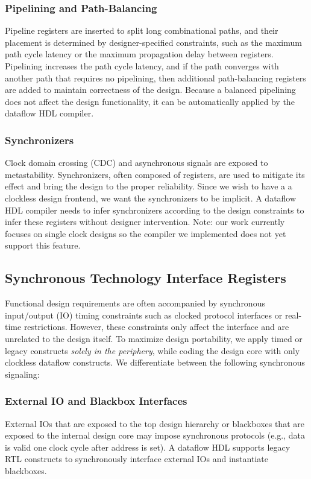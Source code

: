 \subsubsection{Pipelining and Path-Balancing}
Pipeline registers are inserted to split long combinational paths, and their placement is determined by designer-specified constraints, such as the maximum path cycle latency or the maximum propagation delay between registers. Pipelining increases the path cycle latency, and if the path converges with another path that requires no pipelining, then additional path-balancing registers are added to maintain correctness of the design. Because a balanced pipelining does not affect the design functionality, it can be automatically applied by the dataflow HDL compiler.   
\subsubsection{Synchronizers}
Clock domain crossing (CDC) and asynchronous signals are exposed to metastability. Synchronizers, often composed of registers, are used to mitigate its effect and bring the design to the proper reliability. Since we wish to have a a clockless design frontend, we want the synchronizers to be implicit. A dataflow HDL compiler needs to infer synchronizers according to the design constraints to infer these registers without designer intervention. Note: our work currently focuses on single clock designs so the compiler we implemented does not yet support this feature.

\subsection{Synchronous Technology Interface Registers}
Functional design requirements are often accompanied by synchronous input/output (IO) timing constraints such as clocked protocol interfaces or real-time restrictions. However, these constraints only affect the interface and are unrelated to the design itself. To maximize design portability, we apply timed or legacy constructs \emph{solely in the periphery}, while coding the design core with only clockless dataflow constructs. We differentiate between the following synchronous signaling:
\subsubsection{External IO and Blackbox Interfaces}
External IOs that are exposed to the top design hierarchy or blackboxes that are exposed to the internal design core may impose synchronous protocols (e.g., data is valid one clock cycle after address is set). A dataflow HDL supports legacy RTL constructs to synchronously interface external IOs and instantiate blackboxes. 
